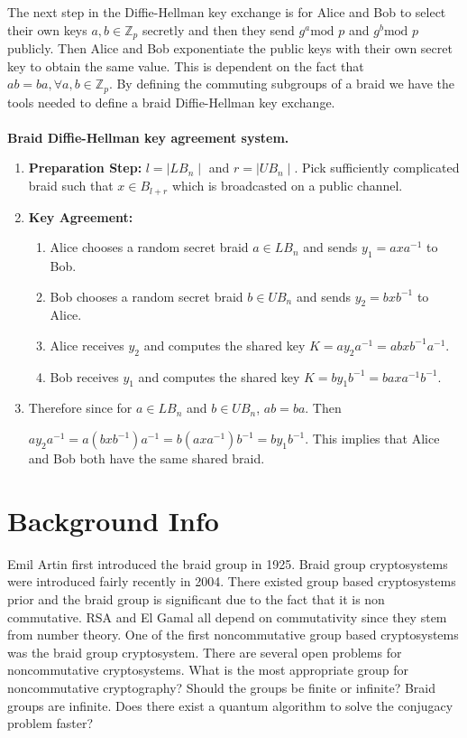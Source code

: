 \documentclass{article}
\theoremstyle{definition}
\begin{document}
The next step in the Diffie-Hellman key exchange is for Alice and Bob to select their own keys $a,b \in \mathbb{Z}_p$  secretly and then they send $g^a \text{mod }p$ and $g^b \text{mod }p$ publicly. Then Alice and Bob exponentiate the public keys with their own secret key to obtain the same value. This is dependent on the fact that $ab=ba,  \forall a,b \in \mathbb{Z}_p$. By defining the commuting subgroups of a braid we have the tools needed to define a braid Diffie-Hellman key exchange. 
\\ \\
\textbf{Braid Diffie-Hellman key agreement system.}
\begin{enumerate}

\item \textbf{Preparation Step:} $l=\mid LB_n \mid$ and $r=\mid UB_n \mid$. Pick sufficiently complicated braid such that $x \in B_{l+r}$ which is broadcasted on a public channel. 

\item \textbf{Key Agreement:} 
	 \begin{enumerate}
	 	\item Alice chooses a random secret braid $a \in LB_n$ and sends $y_1=axa^{-1}$ to Bob.
		\item Bob chooses a random secret braid $b \in UB_n$ and sends $y_2=bxb^{-1}$ to Alice.
		\item Alice receives $y_2$ and computes the shared key $K=ay_2a^{-1}=abxb^{-1}a^{-1}$.
		\item Bob receives $y_1$ and computes the shared key $K=by_1b^{-1}=baxa^{-1}b^{-1}$.
	 \end{enumerate}
\item Therefore since for $a \in LB_n$ and $b \in UB_n$, $ab=ba$. Then
\begin{centering}
$ay_2a^{-1}=a(bxb^{-1})a^{-1}=b(axa^{-1})b^{-1}=by_1b^{-1}$. This implies that Alice and Bob both have the same shared braid.
\end{centering}
\end{enumerate}

\section{Background Info}
Emil Artin first introduced the braid group in 1925. Braid group cryptosystems were introduced fairly recently in 2004. There existed group based cryptosystems prior and the braid group is significant due to the fact that it is non commutative. RSA and El Gamal all depend on commutativity since they stem from number theory. One of the first noncommutative group based cryptosystems was the braid group cryptosystem. There are several open problems for noncommutative cryptosystems. What is the most appropriate group for noncommutative cryptography? Should the groups be finite or infinite? Braid groups are infinite. Does there exist a quantum algorithm to solve the conjugacy problem faster?
\end{document}

